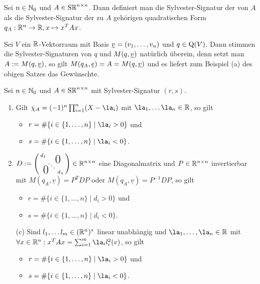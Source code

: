 \documentclass[../../main.tex]{subfiles}
\begin{document}
\begin{df}\label{14.1.3}
Sei $n\in \mathbb N_0$ und $A\in \operatorname{S\mathbb R}^{n\times n}$. Dann definiert man die Sylvester-Signatur der von $A$ als die Sylvester-Signatur der zu $A$ gehörigen quadratischen Form $q_A: \mathbb R^n\to \mathbb R, x\mapsto x^TAx$.
\end{df}
	
\begin{bem}\label{14.1.4}
Sei $V$ ein $\mathbb R$-Vektorraum mit Basis ${\underline v}=(v_1,\ldots ,v_n)$ und $q\in\operatorname{Q}(V)$. Dann stimmen die Sylvester-Signaturen von $q$ und $M(q,{\underline v})$ natürlich überein, denn setzt man $A:=M(q,{\underline v})$, so gilt $M(q_A,{\underline e})=A=M(q,{\underline v} )$ und es liefert zum Beispiel (a) des obigen Satzes das Gewünschte.
\end{bem}

\begin{kor}\label{14.1.5}
Sei $n\in \mathbb N_0$ und $A\in \operatorname{S\mathbb R}^{n\times n}$ mit Sylvester-Signatur $(r,s)$.
\begin{enumerate}[\normalfont(a)]
\item Gilt $\chi_A=(-1)^n\prod_{i=1}^n(X-\la_i)$ mit $\la_1,\ldots \la_n\in \R$, so gilt
\begin{itemize}
\item $r=\#\{i\in \{1,\ldots ,n\}\mid \la_i>0\}$ und
\item $s=\#\{i\in \{1,\ldots ,n\}\mid \la_i<0\}$.
\end{itemize}
		
\item $D:=\left(\begin{smallmatrix}
d_1 & & \llap{$\overset{\blap{\LARGE 0}}{~}$} \\
& \ddots &\\
\rlap{\tlap{\LARGE 0}} & & d_n\end{smallmatrix}\right)\in \R^{n\times n}$ eine Diagonalmatrix und $P\in \mathbb R^{n\times n}$ invertierbar mit $M(q_A,\underline{v})=P^TDP$ oder $M(q_A,\underline{v})=P^{-1}DP$, so gilt
\begin{itemize}
\item $r=\#\{i\in \{1,\ldots ,n\}\mid d_i>0\}$ und
\item $s=\#\{i\in \{1,\ldots ,n\}\mid d_i<0\}$.
\end{itemize}
		
\item[(c)] Sind $l_1,\ldots l_m\in (\mathbb R^n)^*$ linear unabhängig und $\la_1,\ldots ,\la_n\in \R$ mit $\forall x\in \R^n: x^TAx=\sum_{i=1}^m\la_il_i^2(v)$, so gilt
\begin{itemize}
\item $r=\#\{i\in \{1,\ldots ,n\}\mid \la_i>0\}$ und
\item $s=\#\{i\in \{1,\ldots ,n\}\mid \la_i<0\}$.
\end{itemize}
\end{enumerate}
\end{kor}
\end{document}
